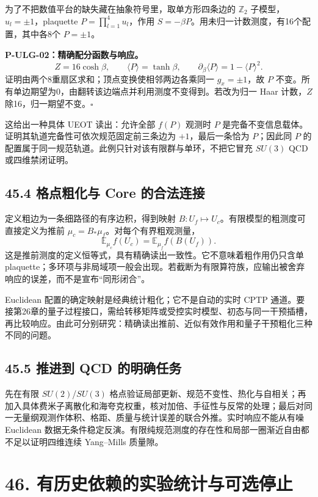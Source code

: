 \documentclass[
  11pt,
  oneside]{book}
\begin{document}
为了不把数值平台的缺失藏在抽象符号里，取单方形四条边的 \(\mathbb Z_2\)
子模型，\(u_l=\pm1\)，plaquette \(P=\prod_{l=1}^4u_l\)，作用
\(S=-\beta P\)。用未归一计数测度，有16个配置，其中各8个 \(P=\pm1\)。

\protect\hypertarget{p-ulg-02}{}{}

\textbf{P-ULG-02：精确配分函数与响应。} \[
Z=16\cosh\beta,\qquad \langle P\rangle=\tanh\beta,
\qquad\partial_\beta\langle P\rangle=1-\langle P\rangle^2.
\] 证明由两个8重扇区求和；顶点变换使相邻两边各乘同一 \(g_x=\pm1\)，故
\(P\)
不变。所有单边期望为0，由翻转该边端点并利用测度不变得到。若改为归一 Haar
计数，\(Z\) 除16，归一期望不变。\(\square\)

这给出一种具体 UEOT 读出：允许全部 \(f(P)\) 观测时 \(P\)
是完备不变信息载体。证明其轨道完备性可依次规范固定前三条边为
\(+1\)，最后一条恰为 \(P\)；因此同 \(P\)
的配置属于同一规范轨道。此例只针对该有限群与单环，不把它冒充 \(SU(3)\)
QCD 或四维禁闭证明。

\section{45.4 格点粗化与 Core 的合法连接}

定义粗边为一条细路径的有序边积，得到映射
\(B:U_f\mapsto U_c\)。有限模型的粗测度可直接定义为推前
\(\mu_c=B_*\mu_f\)。对每个有界粗观测量， \[
\mathbb E_{\mu_c}f(U_c)=\mathbb E_{\mu_f}f(B(U_f)).
\]
这是推前测度的定义恒等式，具有精确读出一致性。它不意味着粗作用仍只含单
plaquette；多环项与非局域项一般会出现。若截断为有限算符族，应输出被舍弃响应的误差，而不是宣布``同形闭合''。

Euclidean 配置的确定映射是经典统计粗化；它不是自动的实时 CPTP
通道。要接第26章的量子过程接口，需给转移矩阵或受控实时模型、初态与同一干预插槽，再比较响应。由此可分别研究：精确读出推前、近似有效作用和量子干预粗化三种不同的问题。

\section{45.5 推进到 QCD 的明确任务}

先在有限 \(SU(2)\)/\(SU(3)\)
格点验证局部更新、规范不变性、热化与自相关；再加入具体费米子离散化和海夸克权重，核对加倍、手征性与反常的处理；最后对同一无量纲观测作体积、格距、质量与统计误差的联合外推。实时响应不能从有噪
Euclidean
数据无条件稳定反演。有限纯规范测度的存在性和局部一圈渐近自由都不足以证明四维连续
Yang--Mills 质量隙。

\chapter{46. 有历史依赖的实验统计与可选停止}\label{ch-46}\hypertarget{ch-46}{}
\end{document}

